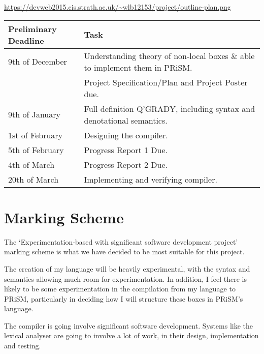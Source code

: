 \documentclass[11pt, a4paper]{article}
\begin{document}
\url{https://devweb2015.cis.strath.ac.uk/~wlb12153/project/outline-plan.png}

\begin{center}
    \begin{tabular}{l | p{7.5cm}}
        Preliminary Deadline & Task \\
        \hline
        9th of December & Understanding theory of non-local boxes \& able to
        implement them in PRiSM. \\

        & Project Specification/Plan and Project Poster due. \\

        9th of January & Full definition Q'GRADY, including syntax and
        denotational semantics. \\

        1st of February & Designing the compiler. \\

        5th of February & Progress Report 1 Due. \\

        4th of March & Progress Report 2 Due. \\

        20th of March & Implementing and verifying compiler. \\
\end{tabular}
\end{center}

\section{Marking Scheme} %
\label{sec:marking_scheme}
The `Experimentation-based with significant software development project'
marking scheme is what we have decided to be most suitable for this project.

The creation of my language will be heavily experimental, with the syntax and
semantics allowing much room for experimentation. In addition, I feel there is
likely to be some experimentation in the compilation from my language to PRiSM,
particularly in deciding how I will structure these boxes in PRiSM's language.

The compiler is going involve significant software development. Systems like the
lexical analyser are going to involve a lot of work, in their design,
implementation and testing. 

\newpage


\end{document}
